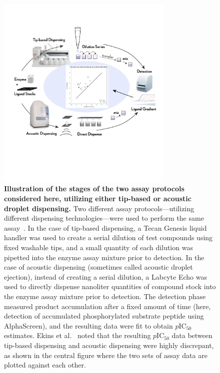 \documentclass[aps,pre,twocolumn,nofootinbib,superscriptaddress,linenumbers]{revtex4-1}
\begin{document}
\begin{figure}[tb]
   \includegraphics[trim={0 15cm 0 8cm},clip,width=0.75\textwidth]{../figures/Fig1-4.pdf}
  \caption{{\bf Illustration of the stages of the two assay protocols considered here, utilizing either tip-based or acoustic droplet dispensing.}
  Two different assay protocols---utilizing different dispensing technologies---were used to perform the same assay~\cite{ekins_dispensing_2013,barlaam_novel_2009,barlaam_pyrimidine_2010}.
  In the case of tip-based dispensing, a Tecan Genesis liquid handler was used to create a serial dilution of test compounds using fixed washable tips, and a small quantity of each dilution was pipetted into the enzyme assay mixture prior to detection.
  In the case of acoustic dispensing (sometimes called acoustic droplet ejection), instead of creating a serial dilution, a Labcyte Echo was used to directly dispense nanoliter quantities of compound stock into the enzyme assay mixture prior to detection.
  The detection phase measured product accumulation after a fixed amount of time (here, detection of accumulated phosphorylated substrate peptide using AlphaScreen), and the resulting data were fit to obtain $p$IC$_{50}$ estimates.
  Ekins et al.~\citep{ekins_dispensing_2013} noted that the resulting $p$IC$_{50}$ data between tip-based dispensing and acoustic dispensing were highly discrepant, as shown in the central figure where the two sets of assay data are plotted against each other.
   }
  \label{fig:overview}
\end{figure}
\end{document}
